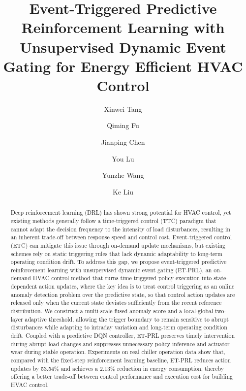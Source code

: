 ﻿\documentclass[preprint,12pt,number]{elsarticle}
\begin{document}
\begin{frontmatter}

\title{Event-Triggered Predictive Reinforcement Learning with Unsupervised Dynamic Event Gating for Energy Efficient HVAC Control}

\author[inst1,inst2]{Xinwei Tang}
\author[inst1,inst2]{Qiming Fu}
\author[inst1,inst2,inst3]{Jianping Chen}
\author[inst1,inst2]{You Lu}
\author[inst1,inst2]{Yunzhe Wang}
\author[inst4]{Ke Liu}

\begin{abstract}
Deep reinforcement learning (DRL) has shown strong potential for HVAC control, yet existing methods generally follow a time-triggered control (TTC) paradigm that cannot adapt the decision frequency to the intensity of load disturbances, resulting in an inherent trade-off between response speed and control cost. Event-triggered control (ETC) can mitigate this issue through on-demand update mechanisms, but existing schemes rely on static triggering rules that lack dynamic adaptability to long-term operating condition drift. To address this gap, we propose event-triggered predictive reinforcement learning with unsupervised dynamic event gating (ET-PRL), an on-demand HVAC control method that turns time-triggered policy execution into state-dependent action updates, where the key idea is to treat control triggering as an online anomaly detection problem over the predictive state, so that control action updates are released only when the current state deviates sufficiently from the recent reference distribution. We construct a multi-scale fused anomaly score and a local-global two-layer adaptive threshold, allowing the trigger boundary to remain sensitive to abrupt disturbances while adapting to intraday variation and long-term operating condition drift. Coupled with a predictive DQN controller, ET-PRL preserves timely intervention during abrupt load changes and suppresses unnecessary policy inference and actuator wear during stable operation. Experiments on real chiller operation data show that, compared with the fixed-step reinforcement learning baseline, ET-PRL reduces action updates by 53.54\% and achieves a 2.13\% reduction in energy consumption, thereby offering a better trade-off between control performance and execution cost for building HVAC control.
\end{abstract}


\end{frontmatter}
\end{document}
